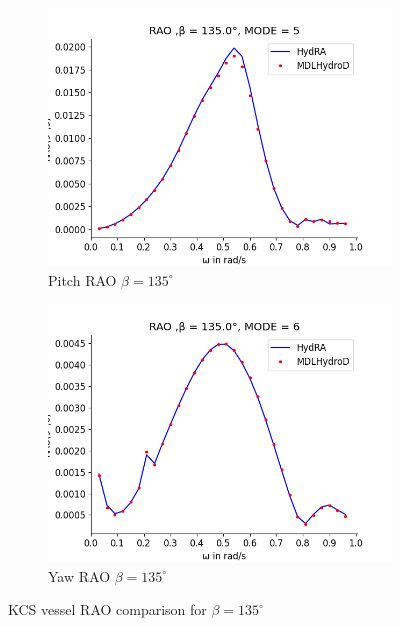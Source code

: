 \begin{figure}[H]
\begin{subfigure}[b]{0.49\textwidth}
        \includegraphics[width=\textwidth]{plots/kcs/rao2/rao5.png}
        \caption{Pitch RAO $\beta = 135^{\circ}$}
    \end{subfigure}
    \begin{subfigure}[b]{0.49\textwidth}
        \includegraphics[width=\textwidth]{plots/kcs/rao2/rao6.png}
        \caption{Yaw RAO $\beta = 135^{\circ}$}
    \end{subfigure}
    \caption{KCS vessel RAO comparison for $\beta= 135^{\circ}$}
    \label{fig:kcs_rao_135}
\end{figure}


\newpage
